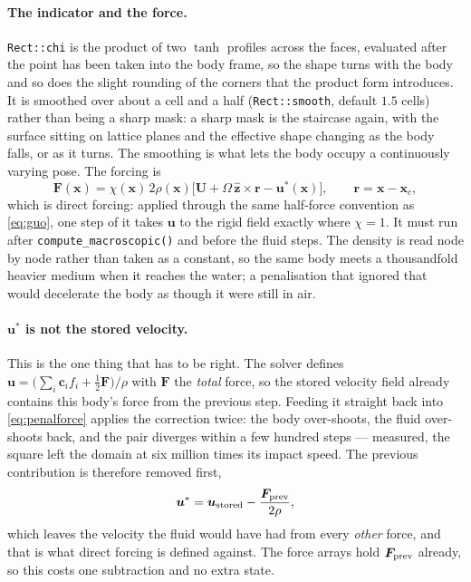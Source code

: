 \documentclass[11pt,a4paper]{article}
\newcommand{\code}[1]{\texttt{\small #1}}
\newcommand{\ci}{\bm{c}_i}
\newcommand{\uu}{\bm{u}}
\newcommand{\xx}{\bm{x}}
\begin{document}
\paragraph{The indicator and the force.} \code{Rect::chi} is the product of two
$\tanh$ profiles across the faces, evaluated after the point has been taken into
the body frame, so the shape turns with the body and so does the slight rounding
of the corners that the product form introduces. It is smoothed over about a cell
and a half (\code{Rect::smooth}, default $1.5$ cells) rather than being a sharp
mask: a sharp mask is the staircase again, with the surface sitting on lattice
planes and the effective shape changing as the body falls, or as it turns. The
smoothing is what lets the body occupy a continuously varying pose. The forcing is
\begin{equation}
  \bm{F}(\xx) = \chi(\xx)\,2\rho(\xx)
    \Big[\bm{U} + \Omega\,\hat{\bm{z}}\times\bm{r} - \uu^{*}(\xx)\Big],
  \qquad \bm{r} = \xx - \xx_c,
  \label{eq:penalforce}
\end{equation}
which is direct forcing: applied through the same half-force convention as
\eqref{eq:guo}, one step of it takes $\uu$ to the rigid field exactly where
$\chi=1$. It must run after \code{compute\_macroscopic()} and before the fluid
steps. The density is read node by node rather than taken as a constant, so the
same body meets a thousandfold heavier medium when it reaches the water; a
penalisation that ignored that would decelerate the body as though it were still
in air.

\paragraph{$\uu^{*}$ is not the stored velocity.} This is the one thing that has
to be right. The solver defines
$\uu = \big(\sum_i \ci f_i + \tfrac12\bm{F}\big)/\rho$ with $\bm{F}$ the
\emph{total} force, so the stored velocity field already contains this body's
force from the previous step. Feeding it straight back into
\eqref{eq:penalforce} applies the correction twice: the body over-shoots, the
fluid over-shoots back, and the pair diverges within a few hundred steps ---
measured, the square left the domain at six million times its impact speed. The
previous contribution is therefore removed first,
\[
  \uu^{*} = \uu_{\rm stored} - \frac{\bm{F}_{\rm prev}}{2\rho},
\]
which leaves the velocity the fluid would have had from every \emph{other} force,
and that is what direct forcing is defined against. The force arrays hold
$\bm{F}_{\rm prev}$ already, so this costs one subtraction and no extra state.
\end{document}
